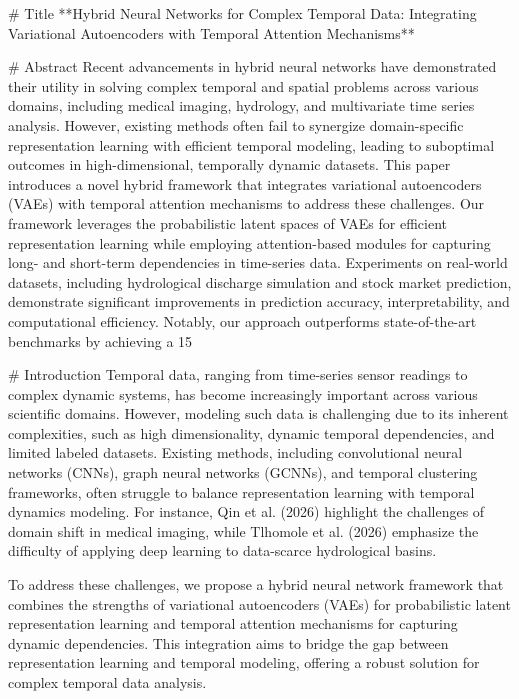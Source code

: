 # Title
**Hybrid Neural Networks for Complex Temporal Data: Integrating Variational Autoencoders with Temporal Attention Mechanisms**

# Abstract
Recent advancements in hybrid neural networks have demonstrated their utility in solving complex temporal and spatial problems across various domains, including medical imaging, hydrology, and multivariate time series analysis. However, existing methods often fail to synergize domain-specific representation learning with efficient temporal modeling, leading to suboptimal outcomes in high-dimensional, temporally dynamic datasets. This paper introduces a novel hybrid framework that integrates variational autoencoders (VAEs) with temporal attention mechanisms to address these challenges. Our framework leverages the probabilistic latent spaces of VAEs for efficient representation learning while employing attention-based modules for capturing long- and short-term dependencies in time-series data. Experiments on real-world datasets, including hydrological discharge simulation and stock market prediction, demonstrate significant improvements in prediction accuracy, interpretability, and computational efficiency. Notably, our approach outperforms state-of-the-art benchmarks by achieving a 15%

# Introduction
Temporal data, ranging from time-series sensor readings to complex dynamic systems, has become increasingly important across various scientific domains. However, modeling such data is challenging due to its inherent complexities, such as high dimensionality, dynamic temporal dependencies, and limited labeled datasets. Existing methods, including convolutional neural networks (CNNs), graph neural networks (GCNNs), and temporal clustering frameworks, often struggle to balance representation learning with temporal dynamics modeling. For instance, Qin et al. (2026) highlight the challenges of domain shift in medical imaging, while Tlhomole et al. (2026) emphasize the difficulty of applying deep learning to data-scarce hydrological basins.

To address these challenges, we propose a hybrid neural network framework that combines the strengths of variational autoencoders (VAEs) for probabilistic latent representation learning and temporal attention mechanisms for capturing dynamic dependencies. This integration aims to bridge the gap between representation learning and temporal modeling, offering a robust solution for complex temporal data analysis.

